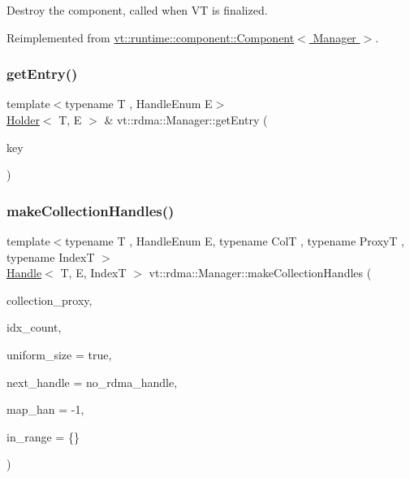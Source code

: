 Destroy the component, called when VT is finalized. 



Reimplemented from \hyperlink{structvt_1_1runtime_1_1component_1_1_component_a098e362de01af6054e5491fba671a959}{vt\+::runtime\+::component\+::\+Component$<$ Manager $>$}.

\mbox{\label{structvt_1_1rdma_1_1_manager_a60c463246971a6d782e55f13fd60d092}} 
\subsubsection{\texorpdfstring{get\+Entry()}{getEntry()}}
{\footnotesize\ttfamily template$<$typename T , Handle\+Enum E$>$ \\
\hyperlink{structvt_1_1rdma_1_1_holder}{Holder}$<$ T, E $>$ \& vt\+::rdma\+::\+Manager\+::get\+Entry (\begin{DoxyParamCaption}\item[{\hyperlink{structvt_1_1rdma_1_1_handle_key}{Handle\+Key} const \&}]{key }\end{DoxyParamCaption})}

\mbox{\label{structvt_1_1rdma_1_1_manager_aad62be5c2cb0225139cf3d665b5fd7f2}} 
\subsubsection{\texorpdfstring{make\+Collection\+Handles()}{makeCollectionHandles()}}
{\footnotesize\ttfamily template$<$typename T , Handle\+Enum E, typename ColT , typename ProxyT , typename IndexT $>$ \\
\hyperlink{structvt_1_1rdma_1_1_handle}{Handle}$<$ T, E, IndexT $>$ vt\+::rdma\+::\+Manager\+::make\+Collection\+Handles (\begin{DoxyParamCaption}\item[{ProxyT}]{collection\+\_\+proxy,  }\item[{std\+::size\+\_\+t}]{idx\+\_\+count,  }\item[{bool}]{uniform\+\_\+size = {\ttfamily true},  }\item[{\hyperlink{namespacevt_a10442579ec4e7ebef223818e64bcf908}{R\+D\+M\+A\+\_\+\+Handle\+Type}}]{next\+\_\+handle = {\ttfamily no\+\_\+rdma\+\_\+handle},  }\item[{\hyperlink{namespacevt_af64846b57dfcaf104da3ef6967917573}{vt\+::\+Handler\+Type}}]{map\+\_\+han = {\ttfamily -\/1},  }\item[{IndexT}]{in\+\_\+range = {\ttfamily \{\}} }\end{DoxyParamCaption})}



